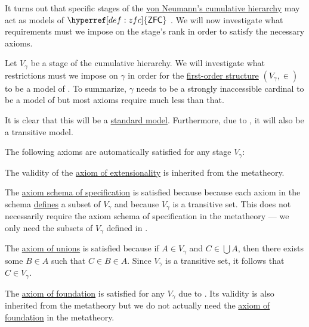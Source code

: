 \begin{remark}\label{remark:cumulative_hierarchy_model_of_zfcu}
  It turns out that specific stages of the \hyperref[def:cumulative_hierarchy]{von Neumann's cumulative hierarchy} may act as models of \( \hyperref[def:zfc]{\logic{ZFC}} \) \). We will now investigate what requirements must we impose on the stage's rank in order to satisfy the necessary axioms.

  Let \( V_\gamma \) be a stage of the cumulative hierarchy. We will investigate what restrictions must we impose on \( \gamma \) in order for the \hyperref[def:first_order_structure]{first-order structure} \( (V_\gamma, \in) \) to be a model of . To summarize, \( \gamma \) needs to be a strongly inaccessible cardinal to be a model of  but most axioms require much less than that.

  It is clear that this will be a \hyperref[rem:standard_model_of_set_theory]{standard model}. Furthermore, due to , it will also be a transitive model.

  The following axioms are automatically satisfied for any stage \( V_\gamma \):
  \begin{thmenum}[series=remark:cumulative_hierarchy_model_of_zfcu]
     The validity of the \hyperref[def:zfc/extensionality]{axiom of extensionality} is inherited from the metatheory.

     The \hyperref[def:zfc/specification]{axiom schema of specification} is satisfied because because each axiom in the schema \hyperref[def:first_order_definability]{defines} a subset of \( V_\gamma \) and because \( V_\gamma \) is a transitive set. This does not necessarily require the axiom schema of specification in the metatheory --- we only need the subsets of \( V_\gamma \) defined in .

     The \hyperref[def:zfc/union]{axiom of unions} is satisfied because if \( A \in V_\gamma \) and \( C \in \bigcup A \), then there exists some \( B \in A \) such that \( C \in B \in A \). Since \( V_\gamma \) is a transitive set, it follows that \( C \in V_\gamma \).

     The \hyperref[def:zfc/foundation]{axiom of foundation} is satisfied for any \( V_\gamma \) due to . Its validity is also inherited from the metatheory but we do not actually need the \hyperref[def:zfc/foundation]{axiom of foundation} in the metatheory.


\end{thmenum}
\end{remark}
